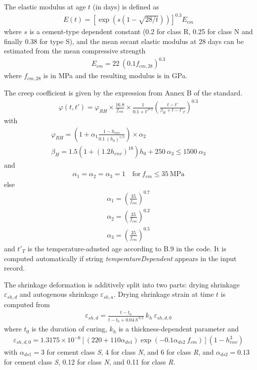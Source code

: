 \documentclass[a4paper]{article}
\newcommand{\param}[1]{{\it #1}}
\begin{document}
The elastic modulus at age $t$ (in days) is defined as
\begin{eqnarray}
E(t) = \left[ \exp \left( s \left(1-\sqrt{28/t} \right) \right)
  \right]^{0.3} E_{cm}
\end{eqnarray}
where $s$ is a cement-type dependent constant (0.2 for class R, 0.25
for class N and finally 0.38 for type S), and the mean secant elastic
modulus at 28 days can be estimated from the mean compressive strength
\begin{eqnarray}
E_{cm} = 22 \: \left(0.1 f_{cm,28} \right)^{0.3} 
\end{eqnarray}
where $f_{cm,28}$ is in MPa and the resulting modulus is in GPa.


The creep coefficient is given by the expression from Annex B of the standard.
\begin{eqnarray}
\varphi(t,t') = \varphi_{RH} \times \frac{16.8}{f_{cm}} \times \frac{1}{0.1 + t'^{0.2}}  \left( \frac{t-t'}{\beta_H + t - t'_T} \right)^{0.3}
\end{eqnarray}
with 
\begin{eqnarray}
\varphi_{RH} = \left( 1 + \alpha_1 \frac{1-h_{env}}{0.1 \: (h_0)^{1/3}} 
\right) \times \alpha_2\\
\beta_H = 1.5 \left(1 + \left( 1.2 h_{env} \right)^{18} \right) h_0 +
250 \: \alpha_3 \leq 1500 \: \alpha_3
\end{eqnarray}
and 
\begin{eqnarray}
\alpha_1 = \alpha_2 = \alpha_3  = 1 \quad \mathrm{for} \: f_{cm} \leq
35 \: \mathrm{MPa}
\end{eqnarray}
else 
\begin{eqnarray}
\alpha_1 = \left( \frac{35}{f_{cm}} \right)^{0.7}\\
\alpha_2 = \left( \frac{35}{f_{cm}} \right)^{0.2}\\
\alpha_3 = \left( \frac{35}{f_{cm}} \right)^{0.5}
\end{eqnarray}
and $t'_T$ is the temperature-adusted age according to B.9 in the
code. It is computed automatically if string
\param{temperatureDependent} appears in the input record.


The shrinkage deformation is additively split into two parts: drying
shrinkage $\varepsilon_{sh,d}$ and autogenous shrinkage
$\varepsilon_{sh,a}$. Drying shrinkage strain at time $t$ is computed from
\begin{eqnarray}
\varepsilon_{sh,d} = \frac{t-t_0}{t-t_0 + 0.04 \: h^{3/2}} \: k_h \: \varepsilon_{sh,d,0}
\end{eqnarray}
where $t_0$ is the duration of curing, $k_h$ is a thickness-dependent
parameter and 
\begin{eqnarray}
\varepsilon_{sh,d,0} = 1.3175 \times 10^{-6} \left[ (220 + 110
  \alpha_{ds1} ) \exp \left( -0.1 \alpha_{ds2} \: f_{cm} \right) \right] \left(
1- h_{env}^3\right)
\end{eqnarray}
with 
$\alpha_{ds1} = 3$ for cement class {\sl{S}}, 4 for class {\sl{N}},
and 6 for class {\sl{R}}, and $\alpha_{ds2} = 0.13$ for cement class {\sl{S}}, 0.12 for class {\sl{N}},
and 0.11 for class {\sl{R}}.
\end{document}
